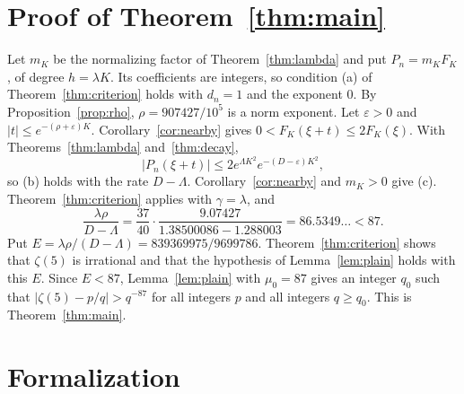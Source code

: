 \documentclass[11pt]{amsart}
\theoremstyle{definition}
\theoremstyle{remark}
\numberwithin{equation}{section}
\begin{document}
\section{Proof of Theorem~\ref{thm:main}}\label{sec:proof}

Let $m_K$ be the normalizing factor of Theorem~\ref{thm:lambda} and put $P_n=m_KF_K$, of degree $h=\lambda K$. Its
coefficients are integers, so condition (a) of Theorem~\ref{thm:criterion} holds with $d_n=1$ and the exponent $0$.
By Proposition~\ref{prop:rho}, $\rho=907427/10^5$ is a norm exponent. Let $\varepsilon>0$ and
$|t|\le e^{-(\rho+\varepsilon)K}$. Corollary~\ref{cor:nearby} gives $0<F_K(\xi+t)\le2F_K(\xi)$. With
Theorems~\ref{thm:lambda} and~\ref{thm:decay},
\[
 |P_n(\xi+t)|\le2e^{\Lambda K^2}e^{-(D-\varepsilon)K^2},
\]
so (b) holds with the rate $D-\Lambda$. Corollary~\ref{cor:nearby} and $m_K>0$ give (c). Theorem~\ref{thm:criterion}
applies with $\gamma=\lambda$, and
\[
 \frac{\lambda\rho}{D-\Lambda}=\frac{37}{40}\cdot\frac{9.07427}{1.38500086-1.288003}=86.5349\ldots<87 .
\]
Put $E=\lambda\rho/(D-\Lambda)=839369975/9699786$. Theorem~\ref{thm:criterion} shows that $\zeta(5)$ is irrational and
that the hypothesis of Lemma~\ref{lem:plain} holds with this $E$. Since $E<87$, Lemma~\ref{lem:plain} with $\mu_0=87$
gives an integer $q_0$ such that $|\zeta(5)-p/q|>q^{-87}$ for all integers $p$ and all integers $q\ge q_0$. This is
Theorem~\ref{thm:main}.

\section{Formalization}\label{sec:lean}
\raggedbottom
\end{document}
